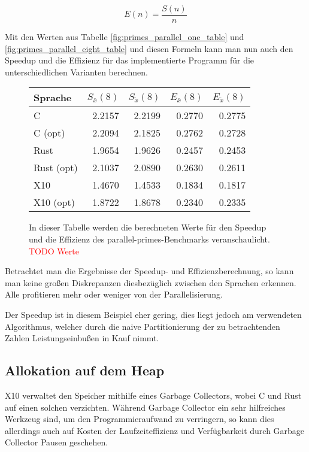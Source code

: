 \begin{equation}
	\label{formula:effizienz}
	E(n) = \frac{S(n)}{n}
\end{equation}

Mit den Werten aus Tabelle \ref{fig:primes_parallel_one_table} und \ref{fig:primes_parallel_eight_table} und diesen
Formeln kann man nun auch den Speedup und die Effizienz für das implementierte Programm für die unterschiedlichen
Varianten berechnen.

\begin{figure}[hb]
	\begin{center}
		\begin{tabular}{lrrrr}
			\toprule
			Sprache & $S_{\bar{x}}(8)$ & $S_{\tilde{x}}(8)$ & $E_{\bar{x}}(8)$ & $E_{\tilde{x}}(8)$ \\
			\midrule
			C          & 2.2157 & 2.2199 & 0.2770 & 0.2775 \\
			C (opt)    & 2.2094 & 2.1825 & 0.2762 & 0.2728 \\
			Rust       & 1.9654 & 1.9626 & 0.2457 & 0.2453 \\
			Rust (opt) & 2.1037 & 2.0890 & 0.2630 & 0.2611 \\
			X10        & 1.4670 & 1.4533 & 0.1834 & 0.1817 \\
			X10 (opt)  & 1.8722 & 1.8678 & 0.2340 & 0.2335 \\
			\bottomrule
		\end{tabular}
	\end{center}
	\caption{
		In dieser Tabelle werden die berechneten Werte für den Speedup und die Effizienz des parallel-primes-Benchmarks
		veranschaulicht.
		\textcolor{red}{TODO Werte}
	}
	\label{fig:primes_parallel_speedup_efficiency_table}
\end{figure}

Betrachtet man die Ergebnisse der Speedup- und Effizienzberechnung, so kann man keine großen Diskrepanzen 
diesbezüglich zwischen den Sprachen erkennen. Alle profitieren mehr oder weniger von der Parallelisierung.

Der Speedup ist in diesem Beispiel eher gering, dies liegt jedoch am verwendeten Algorithmus, welcher durch
die naive Partitionierung der zu betrachtenden Zahlen Leistungseinbußen in Kauf nimmt.

\subsection{Allokation auf dem Heap}

X10 verwaltet den Speicher mithilfe eines Garbage Collectors, wobei C und Rust auf einen solchen verzichten.
Während Garbage Collector ein sehr hilfreiches Werkzeug sind, um den Programmieraufwand zu verringern, so kann dies
allerdings auch auf Kosten der Laufzeiteffizienz und Verfügbarkeit durch Garbage Collector Pausen geschehen.

